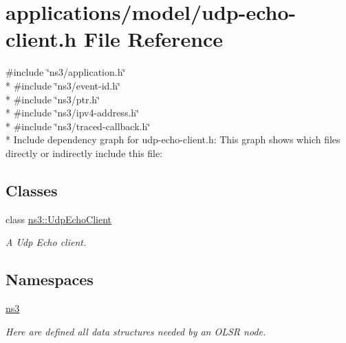 \hypertarget{udp-echo-client_8h}{}\section{applications/model/udp-\/echo-\/client.h File Reference}
\label{udp-echo-client_8h}
{\ttfamily \#include \char`\"{}ns3/application.\+h\char`\"{}}\\*
{\ttfamily \#include \char`\"{}ns3/event-\/id.\+h\char`\"{}}\\*
{\ttfamily \#include \char`\"{}ns3/ptr.\+h\char`\"{}}\\*
{\ttfamily \#include \char`\"{}ns3/ipv4-\/address.\+h\char`\"{}}\\*
{\ttfamily \#include \char`\"{}ns3/traced-\/callback.\+h\char`\"{}}\\*
Include dependency graph for udp-\/echo-\/client.h\+:
This graph shows which files directly or indirectly include this file\+:
\subsection*{Classes}
\begin{DoxyCompactItemize}
\item 
class \hyperlink{classns3_1_1UdpEchoClient}{ns3\+::\+Udp\+Echo\+Client}
\begin{DoxyCompactList}\small\item\em A Udp Echo client. \end{DoxyCompactList}\end{DoxyCompactItemize}
\subsection*{Namespaces}
\begin{DoxyCompactItemize}
\item 
 \hyperlink{namespacens3}{ns3}
\begin{DoxyCompactList}\small\item\em Here are defined all data structures needed by an O\+L\+SR node. \end{DoxyCompactList}\end{DoxyCompactItemize}
